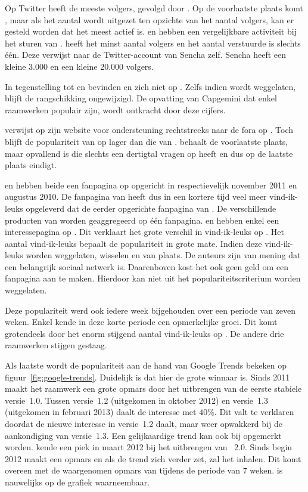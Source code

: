 Op Twitter heeft \jqm{} de meeste volgers, gevolgd door \kendo.
Op de voorlaatste plaats komt \lungo{}, maar als het aantal  wordt uitgezet ten opzichte van het aantal volgers, kan er gesteld worden dat \lungo{} het meest actief is.
\jqm{} en \kendo{} hebben een vergelijkbare activiteit bij het sturen van .
\st{} heeft het minst aantal volgers en het aantal verstuurde  is slechts één.
Deze  verwijst naar de Twitter-account van Sencha zelf.
Sencha heeft een kleine 3.000  en een kleine 20.000 volgers.

In tegenstelling tot \jqm{} en \lungo{} bevinden \kendo{} en \st{} zich niet op \gh{}.
Zelfs indien \gh{} wordt weggelaten, blijft de rangschikking ongewijzigd.
De opvatting van Capgemini dat enkel  raamwerken populair zijn, wordt ontkracht door deze cijfers.

\kendo{} verwijst op zijn website voor ondersteuning rechtstreeks naar de fora op \so{}. 
Toch blijft de populariteit van \kendo{} op \so{} lager dan die van \jqm{}.
\st{} behaalt de voorlaatste plaats, maar opvallend is \lungo{} die slechts een dertigtal vragen op \so{} heeft en dus op de laatste plaats eindigt.

\kendo{} en \jqm{} hebben beide een fanpagina op \fb{} opgericht in respectievelijk november 2011 en augustus 2010.
De fanpagina van \kendo{} heeft dus in een kortere tijd veel meer vind-ik-leuks opgeleverd dat de eerder opgerichte fanpagina van \jqm{}.
De verschillende producten van \kendo{} worden geaggregeerd op één fanpagina. 
\st{} en \lungo{} hebben enkel een interessepagina op \fb.
Dit verklaart het grote verschil in vind-ik-leuks op \fb.
Het aantal vind-ik-leuks bepaalt de populariteit in grote mate.
Indien deze vind-ik-leuks worden weggelaten, wisselen \jqm{} en \kendo{} van plaats.
De auteurs zijn van mening dat \fb{} een belangrijk sociaal netwerk is.
Daarenboven kost het ook geen geld om een fanpagina aan te maken.
Hierdoor kan \fb{} niet uit het populariteitscriterium worden weggelaten.  

Deze populariteit werd ook iedere week bijgehouden over een periode van zeven weken.
Enkel \kendo{} kende in deze korte periode een opmerkelijke groei.
Dit komt grotendeels door het enorm stijgend aantal vind-ik-leuks op \fb{}.
De andere drie raamwerken stijgen gestaag.

Als laatste wordt de populariteit aan de hand van Google Trends bekeken op figuur~\ref{fig:google-trends}.
Duidelijk is dat hier \jqm{} de grote winnaar is.
Sinds 2011 maakt het raamwerk een grote opmars door het uitbrengen van de eerste stabiele versie~1.0.
Tussen versie~1.2 (uitgekomen in oktober 2012) en versie~1.3 (uitgekomen in februari 2013) daalt de interesse met $40\%$.
Dit valt te verklaren doordat de nieuwe interesse in versie~1.2 daalt, maar weer opwakkerd bij de aankondiging van versie~1.3. 
Een gelijkaardige trend kan ook bij \st{} opgemerkt worden.
\st{} kende een piek in maart 2012 bij het uitbrengen van \st{}~2.0.
Sinds begin 2012 maakt \kendo{} een opmars en als de trend zich verder zet, zal het \st{} inhalen.
Dit komt overeen met de waargenomen opmars van \kendo{} tijdens de periode van $7$ weken.
\lungo{} is nauwelijks op de grafiek waarneembaar.

